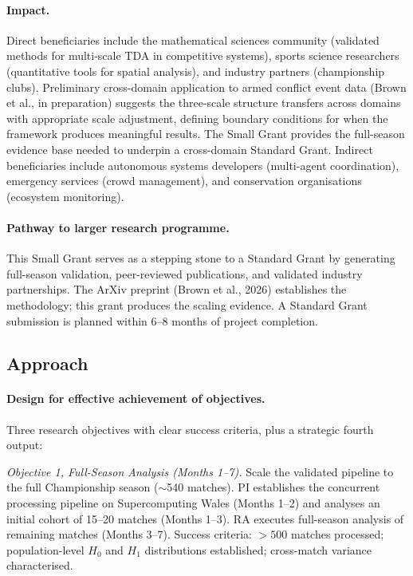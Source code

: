 \paragraph{Impact.}
Direct beneficiaries include the mathematical sciences community (validated methods for multi-scale TDA in competitive systems), sports science researchers (quantitative tools for spatial analysis), and industry partners (championship clubs). Preliminary cross-domain application to armed conflict event data (Brown et al., in preparation) suggests the three-scale structure transfers across domains with appropriate scale adjustment, defining boundary conditions for when the framework produces meaningful results. The Small Grant provides the full-season evidence base needed to underpin a cross-domain Standard Grant. Indirect beneficiaries include autonomous systems developers (multi-agent coordination), emergency services (crowd management), and conservation organisations (ecosystem monitoring).

\paragraph{Pathway to larger research programme.}
This Small Grant serves as a stepping stone to a Standard Grant by generating full-season validation, peer-reviewed publications, and validated industry partnerships. The ArXiv preprint (Brown et al., 2026) establishes the methodology; this grant produces the scaling evidence. A Standard Grant submission is planned within 6--8 months of project completion.

\subsection{Approach}

\paragraph{Design for effective achievement of objectives.}
Three research objectives with clear success criteria, plus a strategic fourth output:

\textit{Objective 1, Full-Season Analysis (Months 1--7).} Scale the validated pipeline to the full Championship season ($\sim$540 matches). PI establishes the concurrent processing pipeline on Supercomputing Wales (Months 1--2) and analyses an initial cohort of 15--20 matches (Months 1--3). RA executes full-season analysis of remaining matches (Months 3--7). Success criteria: ${>}500$ matches processed; population-level $H_0$ and $H_1$ distributions established; cross-match variance characterised.

